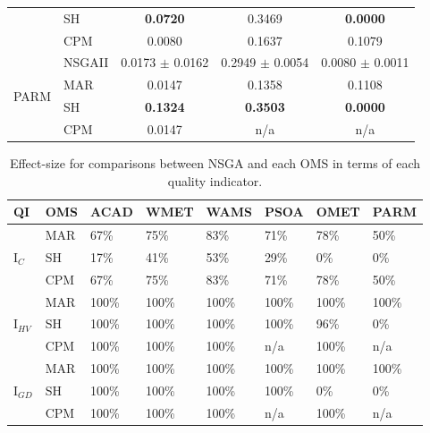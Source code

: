 \documentclass[conference]{IEEEtran}
\begin{document}
\begin{table}[htbp]
\begin{tabular}{p{0.7cm} p{0.7cm} ccc}
          & SH    & \textbf{0.0720} & 0.3469 & \textbf{0.0000} \\
          & CPM   & 0.0080 & 0.1637 & 0.1079 \\\hline
    \multirow{4}[2]{*}{PARM} & NSGAII & 0.0173 $\pm$ 0.0162 & 0.2949 $\pm$ 0.0054 & 0.0080 $\pm$ 0.0011 \\
          & MAR   & 0.0147 & 0.1358 & 0.1108 \\
          & SH    & \textbf{0.1324} & \textbf{0.3503} & \textbf{0.0000} \\
          & CPM   & 0.0147 & n/a   & n/a \\
    \bottomrule
    \end{tabular}%
\end{table}%

\begin{table}[htbp]
  \scriptsize
	\centering
  \caption{Effect-size for comparisons between NSGA and each OMS in terms of each quality indicator.}
    \begin{tabular}{p{0.6cm} p{0.6cm} p{0.65cm} p{0.65cm}p{0.65cm}p{0.65cm}p{0.65cm}p{0.65cm}}
    \toprule
    \textbf{QI} & \textbf{OMS} & \textbf{ACAD} & \textbf{WMET} & \textbf{WAMS} & \textbf{PSOA} & \textbf{OMET} & \textbf{PARM} \\
    \midrule
    \multirow{3}[1]{*}{I$_{C}$} & MAR   & 67\%  & 75\%  & 83\%  & 71\%  & 78\%  & 50\% \\
          & SH    & 17\%  & 41\%  & 53\%  & 29\%  & 0\%   & 0\% \\
          & CPM   & 67\%  & 75\%  & 83\%  & 71\%  & 78\%  & 50\% \\\hline
    \multirow{3}[2]{*}{I$_{HV}$} & MAR   & 100\% & 100\% & 100\% & 100\% & 100\% & 100\% \\
          & SH    & 100\% & 100\% & 100\% & 100\% & 96\%  & 0\% \\
          & CPM   & 100\% & 100\% & 100\% & n/a   & 100\% & n/a \\\hline
    \multirow{3}[2]{*}{I$_{GD}$} & MAR   & 100\% & 100\% & 100\% & 100\% & 100\% & 100\% \\
          & SH    & 100\% & 100\% & 100\% & 100\% & 0\%   & 0\% \\
          & CPM   & 100\% & 100\% & 100\% & n/a   & 100\% & n/a \\
    \bottomrule
    \end{tabular}%
\end{table}%
\end{document}
